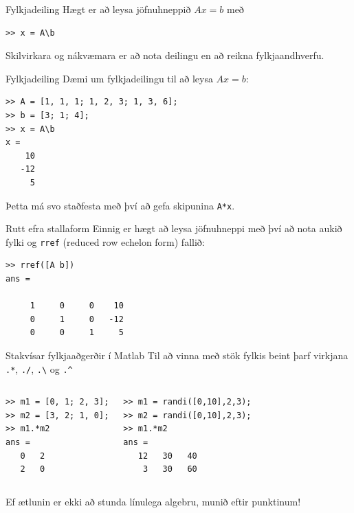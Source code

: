 \documentclass{beamer}
\begin{document}
\begin{frame}[fragile]{Fylkjadeiling}
Hægt er að leysa jöfnuhneppið $A x = b$ með

\begin{verbatim}
>> x = A\b
\end{verbatim}

Skilvirkara og nákvæmara er að nota deilingu en að reikna fylkjaandhverfu.
\end{frame}

\begin{frame}[fragile]{Fylkjadeiling}
Dæmi um fylkjadeilingu til að leysa $A x = b$:
\begin{verbatim}
>> A = [1, 1, 1; 1, 2, 3; 1, 3, 6];
>> b = [3; 1; 4];
>> x = A\b
x =
    10
   -12
     5
\end{verbatim}
Þetta má svo staðfesta með því að gefa skipunina \texttt{A*x}.

\end{frame}

\begin{frame}[fragile]{Rutt efra stallaform}
Einnig er hægt að leysa jöfnuhneppi með því að nota aukið fylki og \texttt{rref} (reduced row echelon form) fallið:

\begin{verbatim}
>> rref([A b])
ans =

     1     0     0    10
     0     1     0   -12
     0     0     1     5
\end{verbatim}

\end{frame}



\begin{frame}[fragile]{Stakvísar fylkjaaðgerðir í Matlab}
\vspace{\baselineskip}
Til að vinna með stök fylkis beint þarf virkjana \texttt{.*}, \texttt{./}, \texttt{.\textbackslash} og \texttt{.\^}
\begin{columns}
\begin{verbatim}
>> m1 = [0, 1; 2, 3];
>> m2 = [3, 2; 1, 0];
>> m1.*m2
ans =
   0   2
   2   0
\end{verbatim}
\begin{verbatim}
>> m1 = randi([0,10],2,3);
>> m2 = randi([0,10],2,3);
>> m1.*m2
ans =
   12   30   40
    3   30   60
\end{verbatim}
\end{columns}
\vspace{\baselineskip}
Ef ætlunin er ekki að stunda línulega algebru, munið eftir punktinum!
\end{frame}
\end{document}
